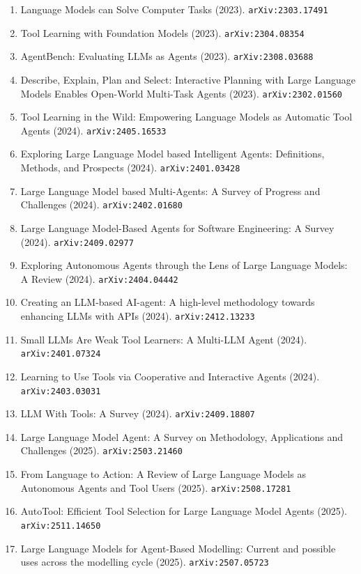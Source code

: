 \documentclass[11pt]{article}
\begin{document}
\begin{enumerate}
  \item Language Models can Solve Computer Tasks (2023). \texttt{arXiv:2303.17491}
  \item Tool Learning with Foundation Models (2023). \texttt{arXiv:2304.08354}
  \item AgentBench: Evaluating LLMs as Agents (2023). \texttt{arXiv:2308.03688}
  \item Describe, Explain, Plan and Select: Interactive Planning with Large
  Language Models Enables Open-World Multi-Task Agents (2023). \texttt{arXiv:2302.01560}
  \item Tool Learning in the Wild: Empowering Language Models as Automatic Tool
  Agents (2024). \texttt{arXiv:2405.16533}
  \item Exploring Large Language Model based Intelligent Agents: Definitions,
  Methods, and Prospects (2024). \texttt{arXiv:2401.03428}
  \item Large Language Model based Multi-Agents: A Survey of Progress and
  Challenges (2024). \texttt{arXiv:2402.01680}
  \item Large Language Model-Based Agents for Software Engineering: A Survey (2024). \texttt{arXiv:2409.02977}
  \item Exploring Autonomous Agents through the Lens of Large Language Models: A
  Review (2024). \texttt{arXiv:2404.04442}
  \item Creating an LLM-based AI-agent: A high-level methodology towards
  enhancing LLMs with APIs (2024). \texttt{arXiv:2412.13233}
  \item Small LLMs Are Weak Tool Learners: A Multi-LLM Agent (2024). \texttt{arXiv:2401.07324}
  \item Learning to Use Tools via Cooperative and Interactive Agents (2024). \texttt{arXiv:2403.03031}
  \item LLM With Tools: A Survey (2024). \texttt{arXiv:2409.18807}
  \item Large Language Model Agent: A Survey on Methodology, Applications and
  Challenges (2025). \texttt{arXiv:2503.21460}
  \item From Language to Action: A Review of Large Language Models as Autonomous Agents and Tool Users (2025). \texttt{arXiv:2508.17281}
  \item AutoTool: Efficient Tool Selection for Large Language Model Agents (2025). \texttt{arXiv:2511.14650}
  \item Large Language Models for Agent-Based Modelling: Current and possible uses across the modelling cycle (2025). \texttt{arXiv:2507.05723}

\end{enumerate}
\end{document}
